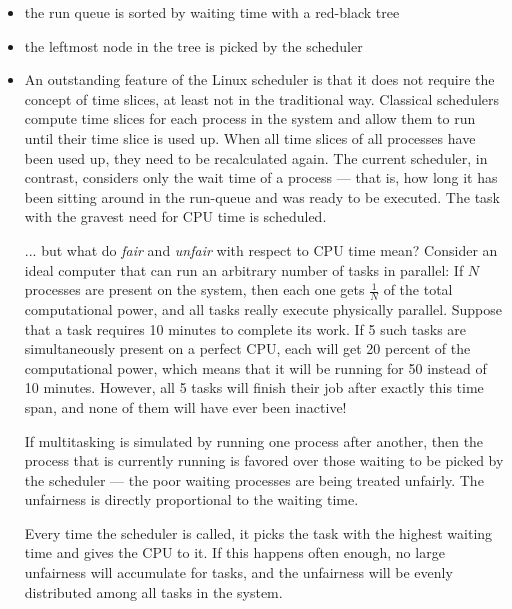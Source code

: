 \begin{frame}
  \begin{center}
  \end{center}
  \begin{itemize}
  \item the run queue is sorted by waiting time with a red-black tree
  \item the leftmost node in the tree is picked by the scheduler
  \end{itemize}
\end{frame}

\begin{itemize}
\item An outstanding feature of the Linux scheduler is that it does not require the
  concept of time slices, at least not in the traditional way. Classical schedulers
  compute time slices for each process in the system and allow them to run until their
  time slice is used up. When all time slices of all processes have been used up, they
  need to be recalculated again. The current scheduler, in contrast, considers only the
  wait time of a process --- that is, how long it has been sitting around in the run-queue
  and was ready to be executed. The task with the gravest need for CPU time is
  scheduled. 

  ... but what do \emph{fair} and \emph{unfair} with respect to CPU time mean? Consider an
  ideal computer that can run an arbitrary number of tasks in parallel: If $N$ processes
  are present on the system, then each one gets $\frac{1}{N}$ of the total computational
  power, and all tasks really execute physically parallel. Suppose that a task requires 10
  minutes to complete its work. If 5 such tasks are simultaneously present on a perfect
  CPU, each will get 20 percent of the computational power, which means that it will be
  running for 50 instead of 10 minutes. However, all 5 tasks will finish their job after
  exactly this time span, and none of them will have ever been inactive!

  If multitasking is simulated by running one process after another, then the process that
  is currently running is favored over those waiting to be picked by the scheduler --- the
  poor waiting processes are being treated unfairly. The unfairness is directly
  proportional to the waiting time.

  Every time the scheduler is called, it picks the task with the highest waiting time and
  gives the CPU to it. If this happens often enough, no large unfairness will accumulate
  for tasks, and the unfairness will be evenly distributed among all tasks in the system.
\end{itemize}

